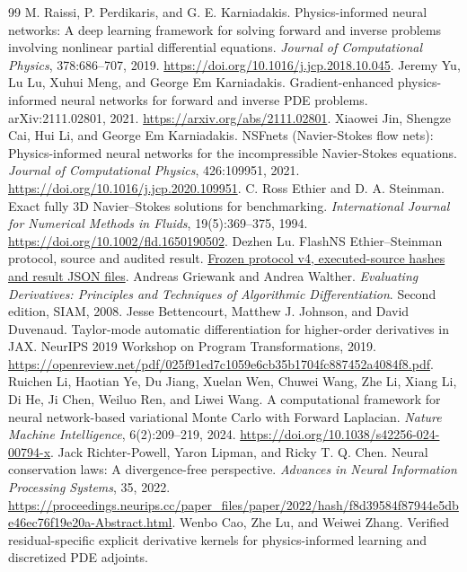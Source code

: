 \documentclass[11pt]{article}
\begin{document}
\begin{thebibliography}{99}
M. Raissi, P. Perdikaris, and G. E. Karniadakis.
Physics-informed neural networks: A deep learning framework for solving forward and inverse problems involving nonlinear partial differential equations.
\emph{Journal of Computational Physics}, 378:686--707, 2019.
\url{https://doi.org/10.1016/j.jcp.2018.10.045}.
Jeremy Yu, Lu Lu, Xuhui Meng, and George Em Karniadakis.
Gradient-enhanced physics-informed neural networks for forward and inverse PDE problems.
arXiv:2111.02801, 2021.
\url{https://arxiv.org/abs/2111.02801}.
Xiaowei Jin, Shengze Cai, Hui Li, and George Em Karniadakis.
NSFnets (Navier-Stokes flow nets): Physics-informed neural networks for the incompressible Navier-Stokes equations.
\emph{Journal of Computational Physics}, 426:109951, 2021.
\url{https://doi.org/10.1016/j.jcp.2020.109951}.
C. Ross Ethier and D. A. Steinman.
Exact fully 3D Navier--Stokes solutions for benchmarking.
\emph{International Journal for Numerical Methods in Fluids}, 19(5):369--375, 1994.
\url{https://doi.org/10.1002/fld.1650190502}.
Dezhen Lu. FlashNS Ethier--Steinman protocol, source and audited result.
\href{https://github.com/0z5a/FlashNS/tree/main/research/ethier-3d}{Frozen protocol v4, executed-source hashes and result JSON files}.
Andreas Griewank and Andrea Walther.
\emph{Evaluating Derivatives: Principles and Techniques of Algorithmic Differentiation}.
Second edition, SIAM, 2008.
Jesse Bettencourt, Matthew J. Johnson, and David Duvenaud.
Taylor-mode automatic differentiation for higher-order derivatives in JAX.
NeurIPS 2019 Workshop on Program Transformations, 2019.
\url{https://openreview.net/pdf/025f91ed7c1059e6cb35b1704fc887452a4084f8.pdf}.
Ruichen Li, Haotian Ye, Du Jiang, Xuelan Wen, Chuwei Wang, Zhe Li, Xiang Li, Di He, Ji Chen, Weiluo Ren, and Liwei Wang.
A computational framework for neural network-based variational Monte Carlo with Forward Laplacian.
\emph{Nature Machine Intelligence}, 6(2):209--219, 2024.
\url{https://doi.org/10.1038/s42256-024-00794-x}.
Jack Richter-Powell, Yaron Lipman, and Ricky T. Q. Chen.
Neural conservation laws: A divergence-free perspective.
\emph{Advances in Neural Information Processing Systems}, 35, 2022.
\url{https://proceedings.neurips.cc/paper_files/paper/2022/hash/f8d39584f87944e5dbe46ec76f19e20a-Abstract.html}.
Wenbo Cao, Zhe Lu, and Weiwei Zhang.
Verified residual-specific explicit derivative kernels for physics-informed learning and discretized PDE adjoints.

\end{thebibliography}
\end{document}
